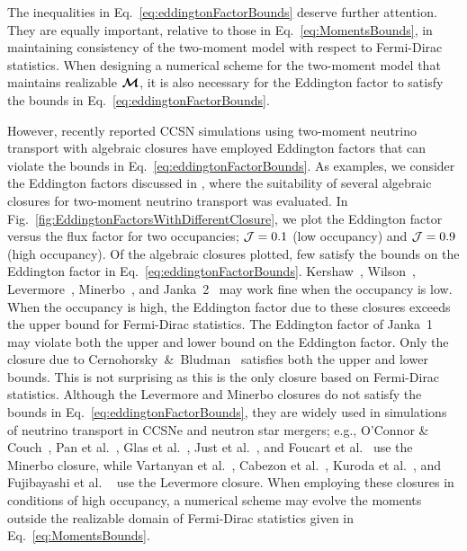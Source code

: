 The inequalities in Eq.~\eqref{eq:eddingtonFactorBounds} deserve further attention.  
They are equally important, relative to those in Eq.~\eqref{eq:MomentsBounds}, in maintaining consistency of the two-moment model with respect to Fermi-Dirac statistics.  
When designing a numerical scheme for the two-moment model that maintains realizable $\boldsymbol{\mathcal{M}}$, it is also necessary for the Eddington factor to satisfy the bounds in Eq.~\eqref{eq:eddingtonFactorBounds}.  

However, recently reported CCSN simulations using two-moment neutrino transport with algebraic closures have employed Eddington factors that can violate the bounds in Eq.~\eqref{eq:eddingtonFactorBounds}.  
As examples, we consider the Eddington factors discussed in \cite{murchikova_etal_2017}, where the suitability of several algebraic closures for two-moment neutrino transport was evaluated.  
In Fig.~\ref{fig:EddingtonFactorsWithDifferentClosure}, we plot the Eddington factor versus the flux factor for two occupancies; $\mathcal{J} = 0.1$ (low occupancy) and $\mathcal{J} = 0.9$ (high occupancy).  
Of the algebraic closures plotted, few satisfy the bounds on the Eddington factor in Eq.~\eqref{eq:eddingtonFactorBounds}.  
Kershaw~\cite{kershaw_1976}, Wilson~\cite{wilson_1975,leblancWilson_1970}, Levermore~\cite{levermore_1984}, Minerbo~\cite{minerbo_1978}, and Janka~2~\cite{janka_1992} may work fine when the occupancy is low.  
When the occupancy is high, the Eddington factor due to these closures exceeds the upper bound for Fermi-Dirac statistics.  
The Eddington factor of Janka~1~\cite{janka_1991} may violate both the upper and lower bound on the Eddington factor.  
Only the closure due to Cernohorsky~\&~Bludman~\cite{cernohorskyBludman_1994} satisfies both the upper and lower bounds.  
This is not surprising as this is the only closure based on Fermi-Dirac statistics.  
Although the Levermore and Minerbo closures do not satisfy the bounds in Eq.~\eqref{eq:eddingtonFactorBounds}, they are widely used in simulations of neutrino transport in CCSNe and neutron star mergers; e.g., O'Connor \& Couch~\cite{oConnorCouch_2018}, Pan et al.~\cite{pan_etal_2018}, Glas et al.~\cite{glas_etal_2018}, Just et al.~\cite{just_etal_2018}, and Foucart et al.~\cite{foucart_etal_2015} use the Minerbo closure, while Vartanyan et al.~\cite{vartanyan_etal_2018}, Cabezon et al.~\cite{cabezon_etal_2018}, Kuroda et al.~\cite{kuroda_etal_2016}, and Fujibayashi et al. ~\cite{fujibayashi_etal_2017} use the Levermore closure.  
When employing these closures in conditions of high occupancy, a numerical scheme may evolve the moments outside the realizable domain of Fermi-Dirac statistics given in Eq.~\eqref{eq:MomentsBounds}.  

